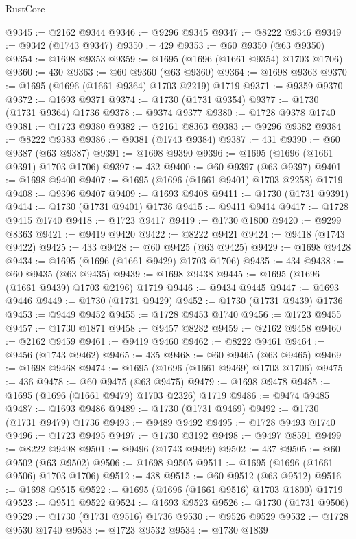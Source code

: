 \begin{lexlean}{RustCore}
\begin{coremodule}
@9345 := @2162 @9344
@9346 := @9296 @9345
@9347 := @8222 @9346
@9349 := @9342 (@1743 @9347)
@9350 := 429
@9353 := @60 @9350 (@63 @9350)
@9354 := @1698 @9353
@9359 := @1695 (@1696 (@1661 @9354) @1703 @1706)
@9360 := 430
@9363 := @60 @9360 (@63 @9360)
@9364 := @1698 @9363
@9370 := @1695 (@1696 (@1661 @9364) @1703 @2219) @1719
@9371 := @9359 @9370
@9372 := @1693 @9371
@9374 := @1730 (@1731 @9354)
@9377 := @1730 (@1731 @9364) @1736
@9378 := @9374 @9377
@9380 := @1728 @9378 @1740
@9381 := @1723 @9380
@9382 := @2161 @8363
@9383 := @9296 @9382
@9384 := @8222 @9383
@9386 := @9381 (@1743 @9384)
@9387 := 431
@9390 := @60 @9387 (@63 @9387)
@9391 := @1698 @9390
@9396 := @1695 (@1696 (@1661 @9391) @1703 @1706)
@9397 := 432
@9400 := @60 @9397 (@63 @9397)
@9401 := @1698 @9400
@9407 := @1695 (@1696 (@1661 @9401) @1703 @2258) @1719
@9408 := @9396 @9407
@9409 := @1693 @9408
@9411 := @1730 (@1731 @9391)
@9414 := @1730 (@1731 @9401) @1736
@9415 := @9411 @9414
@9417 := @1728 @9415 @1740
@9418 := @1723 @9417
@9419 := @1730 @1800
@9420 := @9299 @8363
@9421 := @9419 @9420
@9422 := @8222 @9421
@9424 := @9418 (@1743 @9422)
@9425 := 433
@9428 := @60 @9425 (@63 @9425)
@9429 := @1698 @9428
@9434 := @1695 (@1696 (@1661 @9429) @1703 @1706)
@9435 := 434
@9438 := @60 @9435 (@63 @9435)
@9439 := @1698 @9438
@9445 := @1695 (@1696 (@1661 @9439) @1703 @2196) @1719
@9446 := @9434 @9445
@9447 := @1693 @9446
@9449 := @1730 (@1731 @9429)
@9452 := @1730 (@1731 @9439) @1736
@9453 := @9449 @9452
@9455 := @1728 @9453 @1740
@9456 := @1723 @9455
@9457 := @1730 @1871
@9458 := @9457 @8282
@9459 := @2162 @9458
@9460 := @2162 @9459
@9461 := @9419 @9460
@9462 := @8222 @9461
@9464 := @9456 (@1743 @9462)
@9465 := 435
@9468 := @60 @9465 (@63 @9465)
@9469 := @1698 @9468
@9474 := @1695 (@1696 (@1661 @9469) @1703 @1706)
@9475 := 436
@9478 := @60 @9475 (@63 @9475)
@9479 := @1698 @9478
@9485 := @1695 (@1696 (@1661 @9479) @1703 @2326) @1719
@9486 := @9474 @9485
@9487 := @1693 @9486
@9489 := @1730 (@1731 @9469)
@9492 := @1730 (@1731 @9479) @1736
@9493 := @9489 @9492
@9495 := @1728 @9493 @1740
@9496 := @1723 @9495
@9497 := @1730 @3192
@9498 := @9497 @8591
@9499 := @8222 @9498
@9501 := @9496 (@1743 @9499)
@9502 := 437
@9505 := @60 @9502 (@63 @9502)
@9506 := @1698 @9505
@9511 := @1695 (@1696 (@1661 @9506) @1703 @1706)
@9512 := 438
@9515 := @60 @9512 (@63 @9512)
@9516 := @1698 @9515
@9522 := @1695 (@1696 (@1661 @9516) @1703 @1800) @1719
@9523 := @9511 @9522
@9524 := @1693 @9523
@9526 := @1730 (@1731 @9506)
@9529 := @1730 (@1731 @9516) @1736
@9530 := @9526 @9529
@9532 := @1728 @9530 @1740
@9533 := @1723 @9532
@9534 := @1730 @1839

\end{coremodule}
\end{lexlean}
